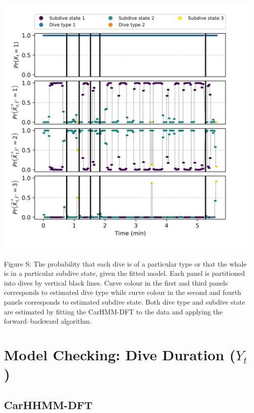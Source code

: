 \documentclass{article}
\begin{document}
        \begin{center}
        \includegraphics[width=6in]{../Plots/2019/20190902-182840-CATs_OB_1_0_267_CarHMM_decoded_states.png}
        \end{center}
        
        \noindent Figure S: The probability that each dive is of a particular type or that the whale is in a particular subdive state, given the fitted model. Each panel is partitioned into dives by vertical black lines. Curve colour in the first and third panels corresponds to estimated dive type while curve colour in the second and fourth panels corresponds to estimated subdive state. Both dive type and subdive state are estimated by fitting the CarHMM-DFT to the data and applying the forward--backward algorithm.
        \addtocounter{fignum}{1}
        
    \newpage
    \section{Model Checking: Dive Duration ($Y_t$)}
    
        \subsection{CarHHMM-DFT}
        
\end{document}

